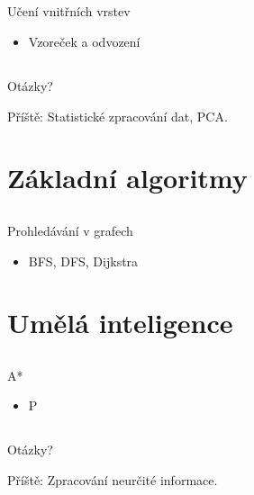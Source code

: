 \documentclass{beamer}
\begin{document}
\subsection{}
\begin{frame}{Učení vnitřních vrstev}
\begin{itemize}
\item Vzoreček a odvození
\end{itemize}
\end{frame}

\subsection{}
\begin{frame}{Otázky?}
\begin{center}
Příště: Statistické zpracování dat, PCA.
\end{center}
\end{frame}

\section{Základní algoritmy}

\subsection{}
\begin{frame}{Prohledávání v grafech}
\begin{itemize}
\item BFS, DFS, Dijkstra
\end{itemize}
\end{frame}

\section{Umělá inteligence}

\subsection{}
\begin{frame}{A*}
\begin{itemize}
\item P
\end{itemize}
\end{frame}

\subsection{}
\begin{frame}{Otázky?}
\begin{center}
Příště: Zpracování neurčité informace.
\end{center}
\end{frame}
\end{document}
